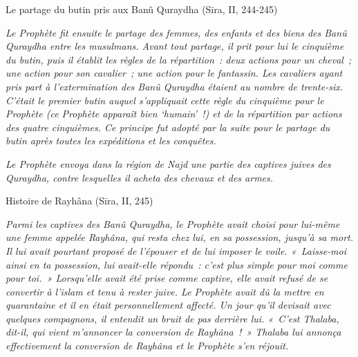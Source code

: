 Le partage du butin pris aux Banû Quraydha (Sīra, II, 244-245)

\emph{Le Prophète fit ensuite le partage des femmes, des enfants et des
biens des Banû Quraydha entre les musulmans. Avant tout partage, il prit
pour lui le cinquième du butin, puis il établit les règles de la
répartition~: deux actions pour un cheval~; une action pour son
cavalier~; une action pour le fantassin. Les cavaliers ayant pris part à
l'extermination des Banû Quraydha étaient au nombre de trente-six.
C'était le premier butin auquel s'appliquait cette règle du cinquième
pour le Prophète (ce Prophète apparaît bien `humain'~!) et de la
répartition par actions des quatre cinquièmes. Ce principe fut adopté
par la suite pour le partage du butin après toutes les expéditions et
les conquêtes.}

\emph{Le Prophète envoya dans la région de Najd une partie des captives
juives des Quraydha, contre lesquelles il acheta des chevaux et des
armes.}

Histoire de Rayhâna (Sīra, II, 245)

\emph{Parmi les captives des Banû Quraydha, le Prophète avait choisi
pour lui-même une femme appelée Rayhâna, qui resta chez lui, en sa
possession, jusqu'à sa mort. Il lui avait pourtant proposé de l'épouser
et de lui imposer le voile. «~Laisse-moi ainsi en ta possession, lui
avait-elle répondu~: c'est plus simple pour moi comme pour toi.~»
Lorsqu'elle avait été prise comme captive, elle avait refusé de se
convertir à l'islam et tenu à rester juive. Le Prophète avait dû la
mettre en quarantaine et il en était personnellement affecté. Un jour
qu'il devisait avec quelques compagnons, il entendit un bruit de pas
derrière lui. «~C'est Thalaba, dit-il, qui vient m'annoncer la
conversion de Rayhâna~!~» Thalaba lui annonça effectivement la
conversion de Rayhâna et le Prophète s'en réjouit.}


